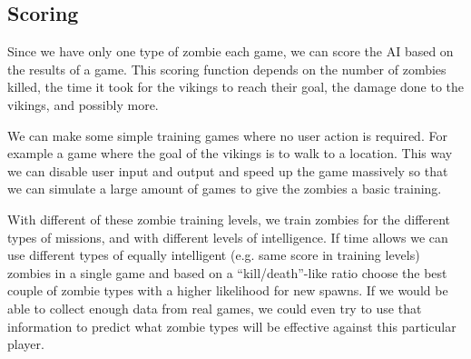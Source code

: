\subsection{Scoring}
Since we have only one type of zombie each game, we can score the AI based on the results of a game. This scoring function depends on the number of zombies killed, the time it took for the vikings to reach their goal, the damage done to the vikings, and possibly more.

We can make some simple training games where no user action is required. For example a game where the goal of the vikings is to walk to a location. This way we can disable user input and output and speed up the game massively so that we can simulate a large amount of games to give the zombies a basic training.

With different of these zombie training levels, we train zombies for the different types of missions, and with different levels of intelligence. If time allows we can use different types of equally intelligent (e.g. same score in training levels) zombies in a single game and based on a ``kill/death''-like ratio choose the best couple of zombie types with a higher likelihood for new spawns. If we would be able to collect enough data from real games, we could even try to use that information to predict what zombie types will be effective against this particular player.